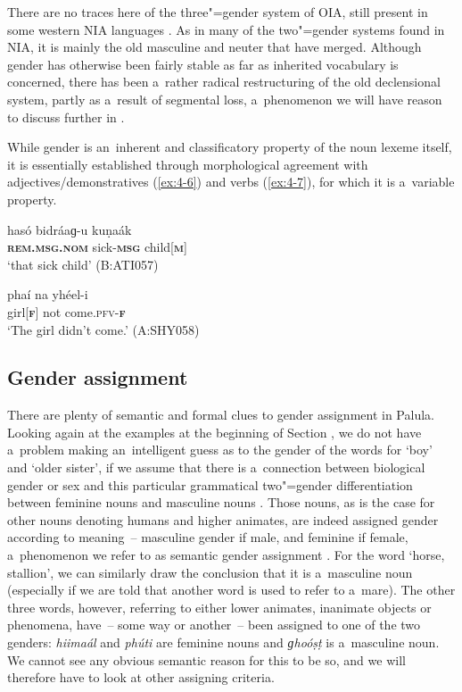 There are no traces here of the three"=gender system of OIA, still present in some western NIA languages \citep[220--221]{masica1991}. As in many of the two"=gender systems found in NIA, it is mainly the old masculine and neuter that have merged. Although gender has otherwise been fairly stable as far as inherited vocabulary is concerned, there has been a~rather radical restructuring of the old declensional system, partly as a~result of segmental loss, a~phenomenon we will have reason to discuss further in .


While gender is an~inherent and classificatory property of the noun lexeme itself, it is essentially established through morphological agreement with adjectives/demonstratives (\ref{ex:4-6}) and verbs (\ref{ex:4-7}), for which it is a~variable property. 


\begin{exe}
\ex
\label{ex:4-6}
\gll hasó bidráaɡ-u kuṇaák \\
	\textbf{\textsc{rem.msg.nom}} sick-\textbf{\textsc{msg}} child[\textbf{\textsc{m}}] \\
\glt `that sick child' (B:ATI057)
\end{exe}

\begin{exe}
\ex
\label{ex:4-7}
\gll phaí na yhéel-i \\
	girl[\textbf{\textsc{f}}] not come.\textsc{pfv-\textbf{\textsc{f}}} \\
\glt `The girl didn't come.' (A:SHY058)
\end{exe}

\subsection{Gender assignment}
\label{subsec:4-3-1}


There are plenty of semantic and formal clues to gender assignment in Palula. Looking again at the examples at the beginning of Section , we do not have a~problem making an~intelligent guess as to the gender of the words for `boy' and `older sister', if we assume that there is a~connection between biological gender or sex and this particular grammatical two"=gender differentiation between feminine nouns and masculine nouns \citep[102]{dahl2000}. Those nouns, as is the case for other nouns denoting humans and higher animates, are indeed assigned gender according to meaning~-- masculine gender if male, and feminine if female, a~phenomenon we refer to as semantic gender assignment \citep[7--32]{corbett1991}. For the word `horse, stallion', we can similarly draw the conclusion that it is a~masculine noun (especially if we are told that another word is used to refer to a~mare). The other three words, however, referring to either lower animates, inanimate objects or phenomena, have~-- some way or another~-- been assigned to one of the two genders: \textit{hiimaál} and \textit{phúti} are feminine nouns and \textit{ɡhoóṣṭ} is a~masculine noun. We cannot see any obvious semantic reason for this to be so, and we will therefore have to look at other assigning criteria.


